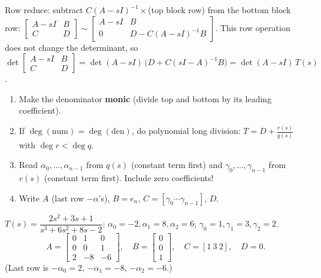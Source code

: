 \begin{proofbox}[title={Proof of the determinant formula (via Lemma 0.19)}]
Row reduce: subtract $C(A-sI)^{-1}\times$(top block row) from the bottom block row:
$\begin{bmatrix}A-sI&B\\C&D\end{bmatrix}\sim\begin{bmatrix}A-sI&B\\0&D-C(A-sI)^{-1}B\end{bmatrix}$. This row operation does not change the determinant, so
$\det\begin{bmatrix}A-sI&B\\C&D\end{bmatrix}=\det(A-sI)\,\big(D+C(sI-A)^{-1}B\big)=\det(A-sI)\,T(s)$.
\end{proofbox}

\begin{methodbox}[title={Method: realise a given $T(s)$}]
\begin{enumerate}
\item Make the denominator \textbf{monic} (divide top and bottom by its leading coefficient).
\item If $\deg(\text{num})=\deg(\text{den})$, do polynomial long division: $T=D+\frac{r(s)}{q(s)}$ with $\deg r<\deg q$.
\item Read $\alpha_0,\dots,\alpha_{n-1}$ from $q(s)$ (constant term first) and $\gamma_0,\dots,\gamma_{n-1}$ from $r(s)$ (constant term first). Include zero coefficients!
\item Write $A$ (last row $-\alpha$'s), $B=e_n$, $C=[\gamma_0\cdots\gamma_{n-1}]$, $D$.
\end{enumerate}
\end{methodbox}

\begin{workbox}[title={Worked example \fr{79--81}}]
$T(s)=\dfrac{2s^2+3s+1}{s^3+6s^2+8s-2}$: $\alpha_0=-2,\alpha_1=8,\alpha_2=6$; $\gamma_0=1,\gamma_1=3,\gamma_2=2$.
\[A=\begin{bmatrix}0&1&0\\0&0&1\\2&-8&-6\end{bmatrix},\quad B=\begin{bmatrix}0\\0\\1\end{bmatrix},\quad C=[1\ 3\ 2],\quad D=0.\]
(Last row is $-\alpha_0=2$, $-\alpha_1=-8$, $-\alpha_2=-6$.)
\end{workbox}

